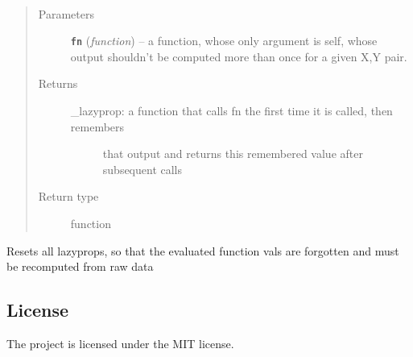 \documentclass[letterpaper,10pt,english]{sphinxmanual}
\begin{document}
\begin{fulllineitems}
\label{index:smbo.lazyprop.lazyprop}~\begin{quote}\begin{description}
\item[{Parameters}] \leavevmode
\textbf{\texttt{fn}} (\emph{function}) -- a function, whose only argument is self, whose output shouldn't
be computed more than once for a given X,Y pair.

\item[{Returns}] \leavevmode
\begin{description}
\item[{\_lazyprop: a function that calls fn the first time it is called, then remembers}] \leavevmode
that output and returns this remembered value after subsequent calls

\end{description}


\item[{Return type}] \leavevmode
function

\end{description}\end{quote}

\end{fulllineitems}


\begin{fulllineitems}
\label{index:smbo.lazyprop.reset_lps}
Resets all lazyprops, so that the evaluated function vals are forgotten and must be
recomputed from raw data

\end{fulllineitems}



\subsection{License}
\label{index:license}
The project is licensed under the MIT license.
\end{document}
